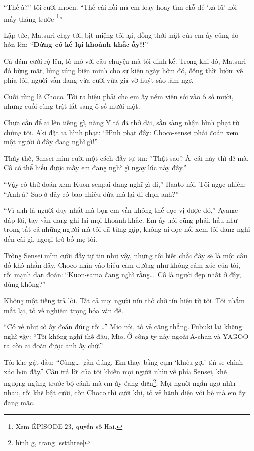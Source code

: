 \documentclass[../main.tex]{subfiles}
\begin{document}
``Thế à?'' tôi cười nhoẻn. ``Thế cái hồi mà em loay hoay tìm chỗ để `xả lũ' hồi mấy tháng trước-\footnote{Xem {\flaregothic ÉPISODE 23}, quyển số Hai.}''

Lập tức, Matsuri chạy tới, bịt miệng tôi lại, đồng thời mặt của em ấy cũng đỏ hỏn lên: ``\textbf{Đừng có kể lại khoảnh khắc ấy!!}''

Cả đám cười rộ lên, tò mò với câu chuyện mà tôi định kể. Trong khi đó, Matsuri đỏ bừng mặt, lúng túng biện minh cho sự kiện ngày hôm đó, đồng thời lườm về phía tôi, người vẫn đang vừa cười vừa giả vờ huýt sáo làm ngơ.

\ct

Cuối cùng là Choco. Tôi ra hiệu phải cho em ấy ném viên sỏi vào ô số mười, nhưng cuối cùng trật lất sang ô số mười một.

Chưa cần để ai lên tiếng gì, nàng Y tá đã thở dài, sẵn sàng nhận hình phạt từ chúng tôi. Aki đặt ra hình phạt: ``Hình phạt đây: Choco-sensei phải đoán xem một người ở đây đang nghĩ gì!''

Thấy thế, Sensei mỉm cười một cách đầy tự tin: ``Thật sao? À, cái này thì dễ mà. Cô có thể hiểu được mấy em đang nghĩ gì ngay lúc này đấy.''

``Vậy cô thử đoán xem Kuon-senpai đang nghĩ gì đi,'' Haato nói. Tôi ngạc nhiên: ``Anh á? Sao ở đây có bao nhiêu đứa mà lại đi chọn anh?''

``Vì anh là người duy nhất mà bọn em vẫn không thể đọc vị được đó,'' Ayame đáp lời, tay vẫn đang ghi lại mọi khoảnh khắc. Em ấy nói cũng phải, hầu như trong tất cả những người mà tôi đã từng gặp, không ai đọc nổi xem tôi đang nghĩ đến cái gì, ngoại trừ bố mẹ tôi.

Trông Sensei mỉm cười đầy tự tin như vậy, nhưng tôi biết chắc đây sẽ là một câu đố khó nhằn đây. Choco nhìn vào biểu cảm dường như không cảm xúc của tôi, rồi mạnh dạn đoán: ``Kuon-sama đang nghĩ rằng\dots\ Cô là người đẹp nhất ở đây, đúng không?''

Không một tiếng trả lời. Tất cả mọi người nín thở chờ tín hiệu từ tôi. Tôi nhắm mắt lại, tỏ vẻ nghiêm trọng hóa vấn đề.

``Có vẻ như cô ấy đoán đúng rồi\dots'' Mio nói, tỏ vẻ căng thẳng. Fubuki lại không nghĩ vậy: ``Tôi không nghĩ thế đâu, Mio. Ở công ty này ngoài A-chan và YAGOO ra còn ai đoán được anh ấy chứ.''

Tôi khẽ gật đầu: ``Cũng\dots\ gần đúng. Em thay bằng cụm `khiêu gợi' thì sẽ chính xác hơn đấy.'' Câu trả lời của tôi khiến mọi người nhìn về phía Sensei, khẽ ngượng ngùng trước bộ cánh mà em ấy đang diện\footnote{hình g, trang \ref{setthree}}. Mọi người ngẩn ngơ nhìn nhau, rồi khẽ bật cười, còn Choco thì cười khì, tỏ vẻ hãnh diện với bộ mà em ấy đang mặc.
\end{document}
